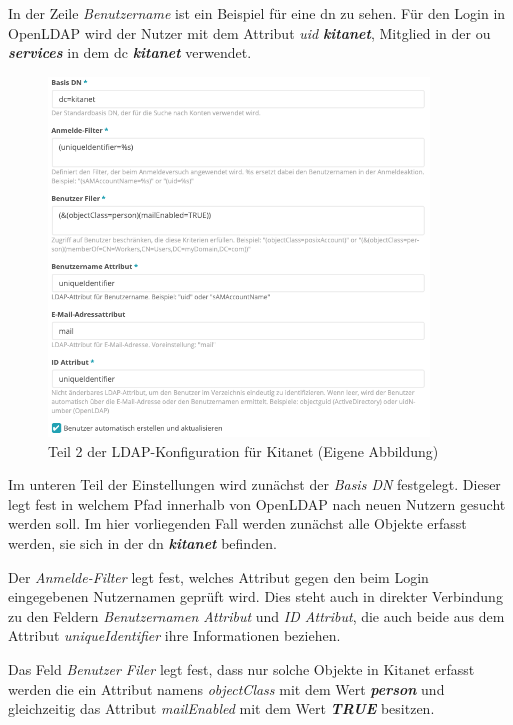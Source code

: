 In der Zeile \textit{Benutzername} ist ein Beispiel für eine \ac{dn} zu sehen. Für den Login in OpenLDAP wird der Nutzer mit dem Attribut \textit{uid} \textbf{\textit{kitanet}}, Mitglied in der \ac{ou} \textbf{\textit{services}} in dem \ac{dc} \textbf{\textit{kitanet}} verwendet.

\begin{figure}[H]
  \centering
  \includegraphics[width=0.9\textwidth]{res/ldapkitanet2.png}
  \caption{Teil 2 der LDAP-Konfiguration für Kitanet (Eigene Abbildung)}
  \label{fig:LDAP Kitanet Teil 2}
\end{figure}

Im unteren Teil der Einstellungen wird zunächst der \textit{Basis DN} festgelegt. Dieser legt fest in welchem Pfad innerhalb von OpenLDAP nach neuen Nutzern gesucht werden soll. Im hier vorliegenden Fall werden zunächst alle Objekte erfasst werden, sie sich in der \ac{dn} \textbf{\textit{kitanet}} befinden.

Der \textit{Anmelde-Filter} legt fest, welches Attribut gegen den beim Login eingegebenen Nutzernamen geprüft wird. 
Dies steht auch in direkter Verbindung zu den Feldern \textit{Benutzernamen Attribut} und \textit{ID Attribut}, die auch beide aus dem Attribut \textit{uniqueIdentifier} ihre Informationen beziehen. 

Das Feld \textit{Benutzer Filer} legt fest, dass nur solche Objekte in Kitanet erfasst werden die ein Attribut namens \textit{objectClass} mit dem Wert \textbf{\textit{person}} und gleichzeitig das Attribut \textit{mailEnabled} mit dem Wert \textbf{\textit{TRUE}} besitzen.

